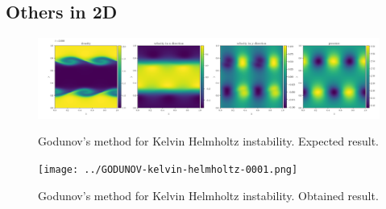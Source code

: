 \clearpage
\subsection{Others in 2D}

    \begin{figure}[htbp]
        \centering
        \includegraphics[width=.9\textwidth]{./figures/GODUNOV-kelvin-helmholtz-0001.png}%
        \caption{Godunov's method for Kelvin Helmholtz instability. Expected result.}
        \texttt{[image: ../GODUNOV-kelvin-helmholtz-0001.png]}%
        \caption{Godunov's method for Kelvin Helmholtz instability. Obtained result.}
    \end{figure}







